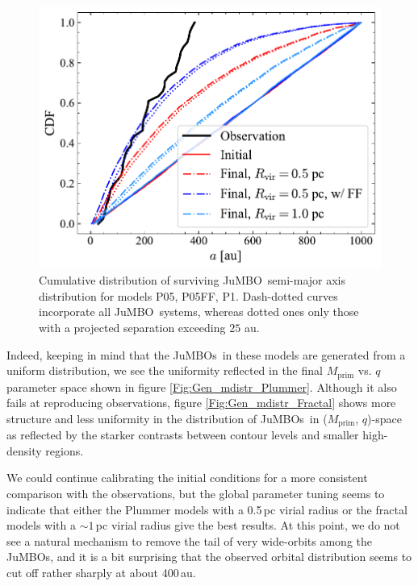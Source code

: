 \documentclass[submission,phys]{lib/SciPost}
\newcommand{\jumbo}{\mbox{JuMBO}}
\newcommand{\jumbos}{\mbox{JuMBOs}}
\begin{document}
\begin{figure}
    \centering
        \includegraphics[width=\columnwidth]{figures/Plummer_General_sem_axis.pdf}
    \caption{Cumulative distribution of surviving \jumbo\, semi-major
      axis distribution for models P05, P05FF, P1. Dash-dotted curves
      incorporate all \jumbo\, systems, whereas dotted ones only those
      with a projected separation exceeding $25$ au.}
         \label{Fig:Gen_Semi_Plummer}
\end{figure}

Indeed, keeping in mind that the \jumbos\, in these models are
generated from a uniform distribution, we see the uniformity
reflected in the final $M_{\mathrm{prim}}$ vs. $q$ parameter space
shown in figure \ref{Fig:Gen_mdistr_Plummer}. Although it also fails
at reproducing observations, figure \ref{Fig:Gen_mdistr_Fractal} shows
more structure and less uniformity in the distribution of \jumbos\, in
($M_{\mathrm{prim}}$, $q$)-space as reflected by the starker contrasts
between contour levels and smaller high-density regions.
    
We could continue calibrating the initial conditions for a more
consistent comparison with the observations, but the global parameter
tuning seems to indicate that either the Plummer models with a 0.5\,pc
virial radius or the fractal models with a $\sim 1$\,pc virial radius
give the best results.  At this point, we do not see a natural
mechanism to remove the tail of very wide-orbits among the \jumbos,
and it is a bit surprising that the observed orbital distribution
seems to cut off rather sharply at about 400\,au.
   
\end{document}
